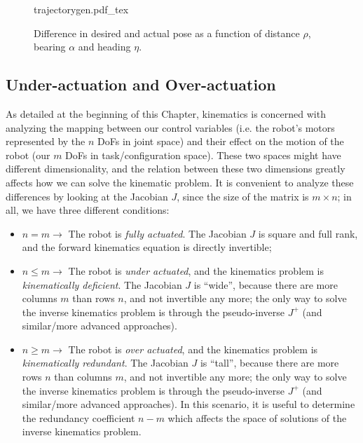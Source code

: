 \begin{figure}
    \centering
    \def\svgwidth{\textwidth}
    {trajectorygen.pdf_tex}
    \caption{Difference in desired and actual pose as a function of distance $\rho$, bearing $\alpha$ and heading $\eta$.}
    \label{fig:trajectorygen}
\end{figure}


\subsection{Under-actuation and Over-actuation}\label{sec:kinematics:diff:underover}

As detailed at the beginning of this Chapter, kinematics is concerned with analyzing the mapping between our control variables (i.e. the robot's motors represented by the $n$ DoFs in joint space) and their effect on the motion of the robot (our $m$ DoFs in task/configuration space). These two spaces might have different dimensionality, and the relation between these two dimensions greatly affects how we can solve the kinematic problem. It is convenient to analyze these differences by looking at the Jacobian $J$, since the size of the matrix is $m \times n$; in all, we have three different conditions:

\begin{itemize}
\item $n   =  m \rightarrow$ The robot is \textsl{fully actuated}. The Jacobian $J$ is square and full rank, and the forward kinematics equation is directly invertible;
\item $n \leq m \rightarrow$ The robot is \textsl{under actuated}, and the kinematics problem is \textsl{kinematically deficient}. The Jacobian $J$ is ``wide'', because there are more columns $m$ than rows $n$, and not invertible any more; the only way to solve the inverse kinematics problem is through the pseudo-inverse $J^+$ (and similar/more advanced approaches).
\item $n \geq m \rightarrow$ The robot is \textsl{over actuated}, and the kinematics problem is \textsl{kinematically redundant}. The Jacobian $J$ is ``tall'', because there are more rows $n$ than columns $m$, and not invertible any more; the only way to solve the inverse kinematics problem is through the pseudo-inverse $J^+$ (and similar/more advanced approaches). In this scenario, it is useful to determine the redundancy coefficient $n-m$ which affects the space of solutions of the inverse kinematics problem.
\end{itemize}

